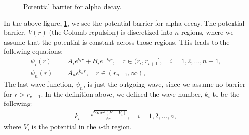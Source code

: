 \documentclass[a4paper]{article}
\begin{document}
\begin{figure}[H]
    \centering
    \caption{Potential barrier for alpha decay.}
    \label{fig: alpha_decay}
\end{figure}\noindent
In the above figure, \ref{fig: alpha_decay}, we see the potential barrier for alpha decay.
The potential barrier, $V(r)$ (the Columb repulsion) is discretized into $n$ regions, where we assume that the potential is constant across those regions.
This leads to the following equations:
\begin{align}
    \psi_i(r) &= A_i e^{k_ir} + B_i e^{-k_ir}, \quad r \in (r_{i}, r_{i + 1}], \quad i = 1,2,...,n - 1, \label{eq: wavefunction}\\
    \psi_n(r) &= A_n e^{k_n r}, \quad r \in (r_{n-1}, \infty), \nonumber%
\end{align}The last wave function, $\psi_n$, is just the outgoing wave, since we assume no barrier for $r > r_{n-1}$. In the definition above, we defined the wave-number, $k_i$ to be the following:
\begin{align}
    k_i = \frac{\sqrt{2mc^2(E-V_i)}}{\hbar c}, \quad i = 1,2,...,n, \label{eq: wave_number}
\end{align}where $V_i$ is the potential in the $i$-th region.
\end{document}
